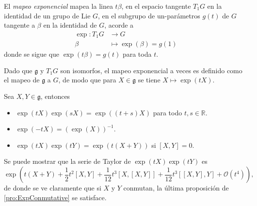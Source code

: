 \begin{mydef}
El \emph{mapeo exponencial} mapea la linea $t \beta$, en el espacio tangente $T_{1} G$ en la identidad de un grupo de Lie $G$, en el subgrupo de un-par\'{a}metros $g (t)$ de $G$ tangente a $\beta$ en la identidad de $G$, acorde a
%
\begin{align*}
\exp: T_{1} G & \longrightarrow G \\
\beta & \longmapsto \exp (\beta) = g (1)
\end{align*}
%
donde se sigue que $\exp (t \beta) = g (t)$ para toda $t$.
\end{mydef}

\begin{obs}
Dado que $\mathfrak{g}$ y $T_{1} G$ son isomorfos, el mapeo exponencial a veces es definido como el mapeo de $\mathfrak{g}$ a $G$, de modo que para $X \in \mathfrak{g}$ se tiene $X \mapsto \exp(tX)$.
\end{obs}

\begin{pro}
\label{pro:ExpConmutative}
Sea $X, Y \in \mathfrak{g}$, entonces
%
\begin{itemize}
\item{$\exp (t X) \exp (s X) = \exp ((t + s) X)$ para todo $t, s \in \mathbb{R}$.}
\item{$\exp (-t X) = (\exp (X))^{-1}$.}
\item{$\exp (t X) \exp (t Y) = \exp (t (X + Y))$ si $[X, Y] = 0$.}
\end{itemize}
%
\end{pro}

Se puede mostrar que la serie de Taylor de $\exp (t X) \exp (t Y)$ es
%
\begin{equation*}
\exp \left( t (X + Y) + \frac{1}{2} t^{2} [X, Y] + \frac{1}{12} t^{3} [X, [X, Y]] + \frac{1}{12} t^{3} [[X, Y], Y] +\mathcal{O}(t^{4}) \right),
\end{equation*}
%
de donde se ve claramente que si $X$ y $Y$ conmutan, la \'{u}ltima proposici\'{o}n de \ref{pro:ExpConmutative} se satisface.

